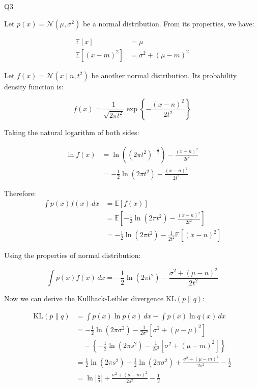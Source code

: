 \question Q3\droppoints

\begin{solution}
    Let $p(x) = \mathcal{N}(\mu, \sigma^2)$ be a normal distribution.
    From its properties, we have:

    \begin{align*}
        \mathbb{E}[x] &= \mu \\
        \mathbb{E}[(x - m)^2] &= \sigma^2 + (\mu - m)^2
    \end{align*}

    Let $f(x) = \mathcal{N}(x \mid n, t^2)$ be another normal distribution.
    Its probability density function is:

    \[
        f(x) = \frac{1}{\sqrt{2\pi t^2}} \exp\left\{-\frac{(x - n)^2}{2t^2}\right\}
    \]

    Taking the natural logarithm of both sides:

    \begin{align*}
        \ln f(x)
        &= \ln\left((2\pi t^2)^{-\frac{1}{2}}\right) - \frac{(x - n)^2}{2t^2} \\
        &= -\frac{1}{2}\ln(2\pi t^2) - \frac{(x - n)^2}{2t^2}
    \end{align*}

    Therefore:
    \begin{align*}
        \int p(x)f(x)\,dx
        &= \mathbb{E}[f(x)] \\
        &= \mathbb{E}\left[-\frac{1}{2}\ln(2\pi t^2) - \frac{(x - n)^2}{2t^2}\right] \\
        &= -\frac{1}{2}\ln(2\pi t^2) - \frac{1}{2t^2}\mathbb{E}\left[(x - n)^2\right]
    \end{align*}

    Using the properties of normal distribution:

    \[
        \int p(x)f(x)\,dx = -\frac{1}{2}\ln(2\pi t^2) - \frac{\sigma^2 + (\mu - n)^2}{2t^2}
    \]

    Now we can derive the Kullback-Leibler divergence $\text{KL}(p \parallel q)$:

    \begin{align*}
        \text{KL}(p \parallel q)
        &= \int p(x)\ln p(x)\,dx - \int p(x)\ln q(x)\,dx \\
        &= -\frac{1}{2}\ln(2\pi \sigma^2) - \frac{1}{2\sigma^2}[\sigma^2 + (\mu - \mu)^2] \\
        &\quad - \left\{-\frac{1}{2}\ln(2\pi s^2) - \frac{1}{2s^2}[\sigma^2 + (\mu - m)^2]\right\} \\
        &= \frac{1}{2}\ln(2\pi s^2) - \frac{1}{2}\ln(2\pi \sigma^2) + \frac{\sigma^2 + (\mu - m)^2}{2s^2} - \frac{1}{2} \\
        &= \ln\left|\frac{s}{\sigma}\right| + \frac{\sigma^2 + (\mu - m)^2}{2s^2} - \frac{1}{2}
    \end{align*}
\end{solution}